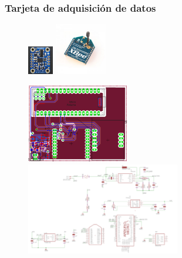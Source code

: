 \documentclass[10pt, compress]{beamer}
\begin{document}
\begin{frame}[fragile]
	\frametitle{Tarjeta de adquisición de datos}
	\begin{figure}[htbp]
		\includegraphics[width=0.1\textwidth]{./pictures/bno055}
		\includegraphics[width=0.2\textwidth]{./pictures/xbee}
	\end{figure}
	\begin{figure}[htbp]
		\includegraphics[width=0.4\textwidth]{./pictures/board}
		\includegraphics[width=0.6\textwidth]{./pictures/schematic}
	\end{figure}
	
\end{frame}	
\end{document}
